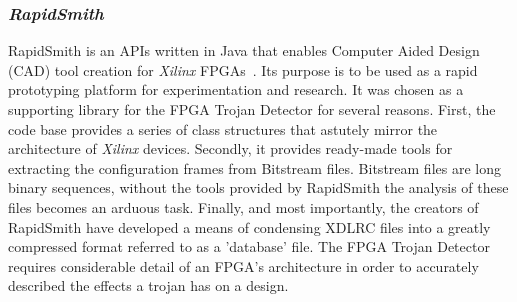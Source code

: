 \documentclass[journal, hidelinks]{IEEEtran}
\begin{document}
\subsubsection{\textit{RapidSmith}} \label{sec:rapidSmith}
RapidSmith is an APIs written in Java that enables Computer Aided Design (CAD) tool creation for \textit{Xilinx} FPGAs~\cite{rapidSmith}.
Its purpose is to be used as a rapid prototyping platform for experimentation and research.
It was chosen as a supporting library for the FPGA Trojan Detector for several reasons.
First, the code base provides a series of class structures that astutely mirror the architecture of \textit{Xilinx} devices.
Secondly, it provides ready-made tools for extracting the configuration frames from Bitstream files. 
Bitstream files are long binary sequences, without the tools provided by RapidSmith the analysis of these files becomes an arduous task.
Finally, and most importantly, the creators of RapidSmith have developed a means of condensing XDLRC files into a greatly compressed format referred to as a 'database' file.
The FPGA Trojan Detector requires considerable detail of an FPGA's architecture in order to accurately described the effects a trojan has on a design.
\end{document}
